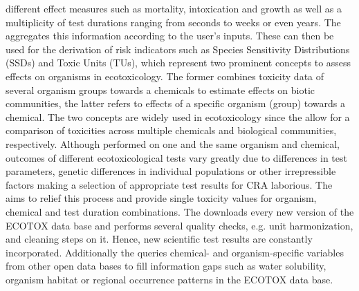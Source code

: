 different effect measures such as mortality, intoxication and growth as well as a multiplicity of test durations ranging from seconds to weeks or even years. The \etoxbase{} aggregates this information according to the user's inputs. These can then be used for the derivation of risk indicators such as Species Sensitivity Distributions (SSDs) \citep{posthuma_species_2002} and Toxic Units (TUs), which represent two prominent concepts to assess effects on organisms in ecotoxicology. The former combines toxicity data of several organism groups towards a chemicals to estimate effects on biotic communities, the latter refers to effects of a specific organism (group) towards a chemical. The two concepts are widely used in ecotoxicology \citep{kefford_definition_2011, schafer_effects_2011} since the allow for a comparison of toxicities across multiple chemicals and biological communities, respectively. Although performed on one and the same organism and chemical, outcomes of different ecotoxicological tests vary greatly due to differences in test parameters, genetic differences in individual populations or other irrepressible factors making a selection of appropriate test results for CRA laborious. The \etoxbase{} aims to relief this process and provide single toxicity values for organism, chemical and test duration combinations. The \etoxbase{} downloads every new version of the ECOTOX data base and performs several quality checks, e.g. unit harmonization, and cleaning steps on it. Hence, new scientific test results are constantly incorporated. Additionally the \etoxbase{} queries chemical- and organism-specific variables from other open data bases to fill information gaps such as water solubility, organism habitat or regional occurrence patterns in the ECOTOX data base.

\fi

